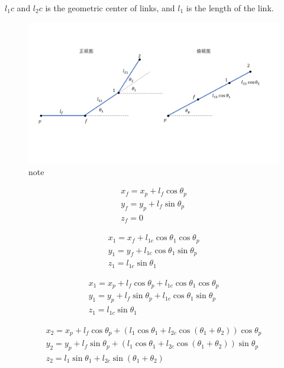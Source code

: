 \documentclass{article}
\begin{document}
$l_1c$ and $l_2c$ is the geometric center of links, and $l_1$ is the length of the link.
\begin{figure}
	\includegraphics[width=\columnwidth]{./note}
	\centering
	\caption{
		note
	}
	\label{MoveError} 	
\end{figure} 

\begin{equation}
	\begin{aligned}
		x_f = x_p+l_f \cos \theta_p \\
		y_f = y_p+l_f \sin \theta_p \\
		z_f = 0		
	\end{aligned}
\end{equation}

\begin{equation}
	\begin{aligned}
		x_1 = x_f + l_{1c} \cos \theta_1 \cos \theta_p \\
		y_1 = y_f + l_{1c} \cos \theta_1 \sin \theta_p \\
		z_1 = l_{1c} \sin \theta_1
	\end{aligned}
\end{equation}

\begin{equation}
	\begin{aligned}
		x_1 = x_p+l_f \cos \theta_p + l_{1c} \cos \theta_1 \cos \theta_p \\
		y_1 = y_p+l_f \sin \theta_p + l_{1c} \cos \theta_1 \sin \theta_p \\
		z_1 = l_{1c} \sin \theta_1
	\end{aligned}
\end{equation}

\begin{equation}
	\begin{aligned}
		x_2 = x_p+l_f \cos \theta_p + (l_{1} \cos \theta_1 + l_{2c} \cos (\theta_1 + \theta_2) )\cos \theta_p \\
		y_2 = y_p+l_f \sin \theta_p + (l_{1} \cos \theta_1 + l_{2c} \cos (\theta_1 + \theta_2) )\sin \theta_p \\
		z_2 = l_{1} \sin \theta_1 + l_{2c} \sin (\theta_1 + \theta_2)
	\end{aligned}
\end{equation}
\end{document}

